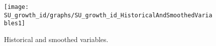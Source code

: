  
\begin{figure}[H]
\centering 
\texttt{[image: SU\_growth\_id/graphs/SU\_growth\_id\_HistoricalAndSmoothedVariables1]}
\caption{Historical and smoothed variables.}\label{Fig:HistoricalAndSmoothedVariables:1}
\end{figure}


